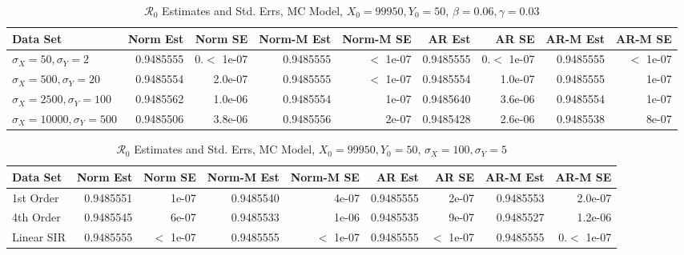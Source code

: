 \documentclass[12pt]{article}
\newcommand{\rr}{\ensuremath{\mathcal{R}_0}}
\begin{document}
\begin{table}[H]
	
	\caption{\label{tab:}$\rr$ Estimates and Std. Errs, MC Model,
		$X_0 = 99950, Y_0 = 50$, $\beta = 0.06, \gamma = 0.03$}
	\centering
	\begin{footnotesize}
		\begin{tabular}[t]{l|r|r|r|r|r|r|r|r}
			\hline
			Data Set & Norm Est & Norm SE & Norm-M Est & Norm-M SE & AR Est & AR SE & AR-M Est & AR-M SE\\
			\hline
			$\sigma_X = 50, \sigma_Y = 2$ & 0.9485555 & 0.$<$ 1e-07 & 0.9485555 & $<$ 1e-07 & 0.9485555 & 0.$<$ 1e-07 & 0.9485555 & $<$ 1e-07\\
			\hline
			$\sigma_X = 500, \sigma_Y = 20$ & 0.9485554 & 2.0e-07 & 0.9485555 & $<$ 1e-07 & 0.9485554 & 1.0e-07 & 0.9485555 & 1e-07\\
			\hline
			$\sigma_X = 2500, \sigma_Y = 100$ & 0.9485562 & 1.0e-06 & 0.9485554 & 1e-07 & 0.9485640 & 3.6e-06 & 0.9485554 & 1e-07\\
			\hline
			$\sigma_X = 10000, \sigma_Y = 500$ & 0.9485506 & 3.8e-06 & 0.9485556 & 2e-07 & 0.9485428 & 2.6e-06 & 0.9485538 & 8e-07\\
			\hline
		\end{tabular}
	\end{footnotesize}
\end{table}

\begin{table}[H]
	
	\caption{\label{tab:}$\rr$ Estimates and Std. Errs, MC Model,
		$X_0 = 99950, Y_0 = 50$, $\sigma_X = 100, \sigma_Y = 5$}
	\centering
	\begin{footnotesize}
		\begin{tabular}[t]{l|r|r|r|r|r|r|r|r}
			\hline
			Data Set & Norm Est & Norm SE & Norm-M Est & Norm-M SE & AR Est & AR SE & AR-M Est & AR-M SE\\
			\hline
			1st Order & 0.9485551 & 1e-07 & 0.9485540 & 4e-07 & 0.9485555 & 2e-07 & 0.9485553 & 2.0e-07\\
			\hline
			4th Order & 0.9485545 & 6e-07 & 0.9485533 & 1e-06 & 0.9485535 & 9e-07 & 0.9485527 & 1.2e-06\\
			\hline
			Linear SIR & 0.9485555 & $<$ 1e-07 & 0.9485555 & $<$ 1e-07 & 0.9485555 & $<$ 1e-07 & 0.9485555 & 0.$<$ 1e-07\\
			\hline
		\end{tabular}
	\end{footnotesize}
\end{table}
\end{document}
